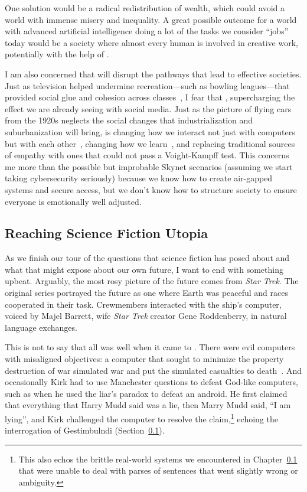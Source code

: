 One solution would be a radical redistribution of wealth, which could
avoid a world with immense misery and inequality. A great possible
outcome for a world with advanced artificial intelligence doing a lot
of the tasks we consider ``jobs'' today would be a society where
almost every human is involved in creative work, potentially with the
help of .

I am also concerned that  will disrupt the pathways that lead
to effective societies.
%
Just as television helped undermine recreation---such as bowling
leagues---that provided social glue and cohesion across
classes~\cite{}, I fear that , supercharging the effect we are
already seeing with social media.
%
Just as the picture of flying cars from the 1920s neglects the social
changes that industrialization and suburbanization will bring,
 is changing how we interact not just with computers but with
each other~\cite{}, changing how we learn~\cite{}, and replacing
traditional sources of empathy with ones that could not pass a
Voight-Kampff test.
%
This concerns me more than the possible but improbable Skynet
scenarios (assuming we start taking cybersecurity seriously) because
we know how to create air-gapped systems and secure access, but we
don't know how to structure society to ensure everyone is emotionally
well adjusted.

\subsection{Reaching Science Fiction Utopia}

As we finish our tour of the questions that science fiction has posed
about  and what that might expose about our own future, I want
to end with something upbeat.
%
Arguably, the most rosy picture of the future comes from \textit{Star
  Trek}.
%
The original series portrayed the future as one where Earth was
peaceful and races cooperated in their task.
%
Crewmembers interacted with the ship's computer, voiced by Majel
Barrett, wife \textit{Star Trek} creator Gene Roddenberry, in natural
language exchanges.

This is not to say that all was well when it came to .  There
were evil computers with misaligned objectives: a computer that sought
to minimize the property destruction of war simulated war and put the
simulated casualties to death~\cite{}.  And occasionally Kirk had to
use Manchester questions to defeat God-like computers, such as when he
used the liar's paradox to defeat an android.
%
He first claimed that everything that Harry Mudd said was a lie, then
Marry Mudd said, ``I am lying'', and Kirk challenged the computer to
resolve the claim,\footnote{This also echos the brittle real-world
  systems we encountered in Chapter~\ref{} that were unable to deal
  with parses of sentences that went slightly wrong or ambiguity.}
echoing the interrogation of Gestimbulndi (Section~\ref{}).


